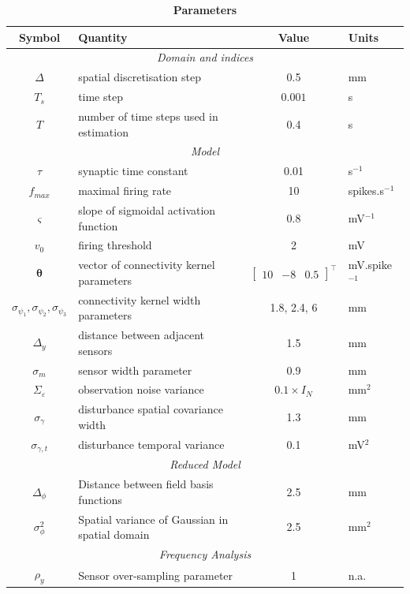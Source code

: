 \documentclass[10pt]{article}
\begin{document}
\begin{table}[!ht]
\caption{
\bf{Parameters}}
\begin{tabular}{|c|l|c|l|}
	\hline
	\textbf{Symbol} & \textbf{Quantity} & \textbf{Value} & \textbf{Units}\\
	\hline
	\multicolumn{4}{|c|}{\emph{Domain and indices}}\\
	\hline
	$\Delta$ & spatial discretisation step & 0.5 & mm \\
	$T_s$ & time step & $0.001$ & s\\
	$T$ & number of time steps used in estimation & 0.4 & s\\
	\hline 
\multicolumn{4}{|c|}{\emph{Model}}\\
	\hline
	$\tau$ & synaptic time constant & 0.01 & s$^{-1}$ \\
	$f_{max}$ & maximal firing rate & 10 & spikes.s$^{-1}$\\
	$\varsigma$ & slope of sigmoidal activation function & 0.8 & mV$^{-1}$\\
	$v_0$ & firing threshold & 2 & mV \\
	$\boldsymbol{\theta}$ & vector of connectivity kernel parameters & $\left[\begin{array}{ccc}
	10 &-8 &0.5
	\end{array}
	\right]^{\top}$ & mV.spike$^{-1}$\\
	$\sigma_{\psi_{1}}, \sigma_{\psi_{2}}, \sigma_{\psi_{3}}$ & connectivity kernel width parameters & 1.8, 2.4, 6 & mm\\
	$\Delta_y$ & distance between adjacent sensors & 1.5 & mm\\
	$\sigma_{m}$ & sensor width parameter & 0.9 & mm \\
	$\Sigma_{\varepsilon}$ & observation noise variance & $0.1 \times I_{N}$ & mm$^2$ \\
	$\sigma_{\gamma}$& disturbance spatial covariance width & 1.3 & mm\\
	$\sigma_{\gamma,t}$ & disturbance temporal variance & 0.1 & mV$^2$ \\
	\hline 
	\multicolumn{4}{|c|}{\emph{Reduced Model}}\\
	\hline
	$\Delta_{\phi}$ & Distance between field basis functions & 2.5 & mm \\
	$\sigma^2_{\phi}$ & Spatial variance of Gaussian in spatial domain & 2.5 & mm$^2$\\
	\hline 
	\multicolumn{4}{|c|}{\emph{Frequency Analysis}}\\
	\hline
	$\rho_y$ & Sensor over-sampling parameter & 1 & n.a.\\

\end{tabular}
\end{table}
\end{document}
